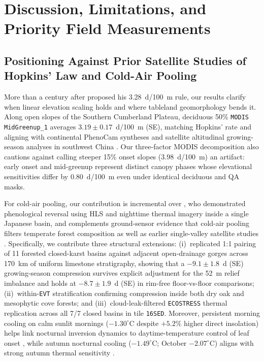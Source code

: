 \section{Discussion, Limitations, and Priority Field Measurements}
\label{sec:discussion}

\subsection{Positioning Against Prior Satellite Studies of Hopkins' Law and Cold-Air Pooling}
More than a century after \citet{hopkins1918} proposed his 3.28~d/100~m rule, our results clarify when linear elevation scaling holds and where tableland geomorphology bends it. Along open slopes of the Southern Cumberland Plateau, deciduous 50\% \texttt{MODIS MidGreenup\_1} averages $3.19 \pm 0.17$~d/100~m (SE), matching Hopkins' rate and aligning with continental PhenoCam syntheses \citep{richardson2019} and satellite altitudinal growing-season analyses in southwest China \citep{jiang2022}. Our three-factor MODIS decomposition also cautions against calling steeper 15\% onset slopes ($3.98$~d/100~m) an artifact: early onset and mid-greenup represent distinct canopy phases whose elevational sensitivities differ by $0.80$~d/100~m even under identical deciduous and QA masks.

For cold-air pooling, our contribution is incremental over \citet{mizuno2026}, who demonstrated phenological reversal using HLS and nighttime thermal imagery inside a single Japanese basin, and complements ground-sensor evidence that cold-air pooling filters temperate forest composition \citep{pastore2024} as well as earlier single-valley satellite studies \citep{fisher2006, elmore2012, ward2018}. Specifically, we contribute three structural extensions: (i)~replicated 1:1 pairing of 11 forested closed-karst basins against adjacent open-drainage gorges across 170~km of uniform limestone stratigraphy, showing that a $-9.1 \pm 1.8$~d (SE) growing-season compression survives explicit adjustment for the 52~m relief imbalance and holds at $-8.7 \pm 1.9$~d (SE) in rim-free floor-vs-floor comparisons; (ii)~within-\texttt{EVT} stratification confirming compression inside both dry oak and mesophytic cove forests; and (iii)~cloud-leak-filtered \texttt{ECOSTRESS} thermal replication across all 7/7 closed basins in tile \texttt{16SED}. Moreover, persistent morning cooling on calm sunlit mornings ($-1.30^\circ$C despite $+5.2\%$ higher direct insolation) helps link nocturnal inversion dynamics to daytime-temperature control of leaf onset \citep{piao2015}, while autumn nocturnal cooling ($-1.49^\circ$C; October $-2.07^\circ$C) aligns with strong autumn thermal sensitivity \citep{fu2018}.

